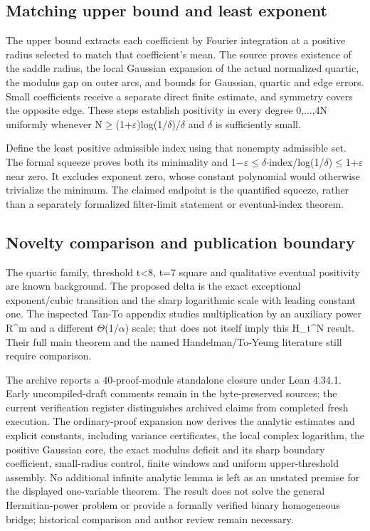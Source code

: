 \documentclass[11pt,a4paper]{article}
\begin{document}
\subsection{Matching upper bound and least exponent}
The upper bound extracts each coefficient by Fourier integration at a positive radius selected to match that coefficient's mean. The source proves existence of the saddle radius, the local Gaussian expansion of the actual normalized quartic, the modulus gap on outer arcs, and bounds for Gaussian, quartic and edge errors. Small coefficients receive a separate direct finite estimate, and symmetry covers the opposite edge. These steps establish positivity in every degree 0,...,4N uniformly whenever N\ensuremath{\geq}(1+\ensuremath{\varepsilon})log(1/\ensuremath{\delta})/\ensuremath{\delta} and \ensuremath{\delta} is sufficiently small.

Define the least positive admissible index using that nonempty admissible set. The formal squeeze proves both its minimality and 1\ensuremath{-}\ensuremath{\varepsilon}\ensuremath{\leq}\ensuremath{\delta}\ensuremath{\cdot}index/log(1/\ensuremath{\delta})\ensuremath{\leq}1+\ensuremath{\varepsilon} near zero. It excludes exponent zero, whose constant polynomial would otherwise trivialize the minimum. The claimed endpoint is the quantified squeeze, rather than a separately formalized filter-limit statement or eventual-index theorem.

\subsection{Novelty comparison and publication boundary}
The quartic family, threshold t<8, t=7 square and qualitative eventual positivity are known background. The proposed delta is the exact exceptional exponent/cubic transition and the sharp logarithmic scale with leading constant one. The inspected Tan-To appendix studies multiplication by an auxiliary power R\textasciicircum{}m and a different \ensuremath{\Theta}(1/\ensuremath{\alpha}) scale; that does not itself imply this H\_t\textasciicircum{}N result. Their full main theorem and the named Handelman/To-Yeung literature still require comparison.

The archive reports a 40-proof-module standalone closure under Lean 4.34.1. Early uncompiled-draft comments remain in the byte-preserved sources; the current verification register distinguishes archived claims from completed fresh execution. The ordinary-proof expansion now derives the analytic estimates and explicit constants, including variance certificates, the local complex logarithm, the positive Gaussian core, the exact modulus deficit and its sharp boundary coefficient, small-radius control, finite windows and uniform upper-threshold assembly. No additional infinite analytic lemma is left as an unstated premise for the displayed one-variable theorem. The result does not solve the general Hermitian-power problem or provide a formally verified binary homogeneous bridge; historical comparison and author review remain necessary.
\end{document}
